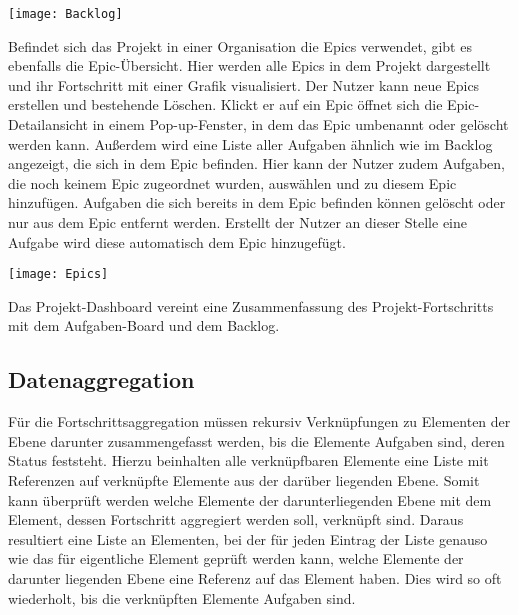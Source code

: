 \vspace{20pt}
\begin{center}
    \begin{minipage}{\linewidth}
        \texttt{[image: Backlog]}
    \end{minipage}
\end{center}
\vspace{20pt}

Befindet sich das Projekt in einer Organisation die Epics verwendet, gibt es ebenfalls die Epic-Übersicht. Hier werden alle Epics in dem Projekt dargestellt und ihr Fortschritt mit einer Grafik visualisiert. Der Nutzer kann neue Epics erstellen und bestehende Löschen. Klickt er auf ein Epic öffnet sich die Epic-Detailansicht in einem Pop-up-Fenster, in dem das Epic umbenannt oder gelöscht werden kann. Außerdem wird eine Liste aller Aufgaben ähnlich wie im Backlog angezeigt, die sich in dem Epic befinden. Hier kann der Nutzer zudem Aufgaben, die noch keinem Epic zugeordnet wurden, auswählen und zu diesem Epic hinzufügen. Aufgaben die sich bereits in dem Epic befinden können gelöscht oder nur aus dem Epic entfernt werden. Erstellt der Nutzer an dieser Stelle eine Aufgabe wird diese automatisch dem Epic hinzugefügt.

\vspace{20pt}
\begin{center}
    \begin{minipage}{\linewidth}
        \texttt{[image: Epics]}
    \end{minipage}
\end{center}
\vspace{20pt}

Das Projekt-Dashboard vereint eine Zusammenfassung des Projekt-Fortschritts mit dem Aufgaben-Board und dem Backlog.

\subsection{Datenaggregation}
Für die Fortschrittsaggregation müssen rekursiv Verknüpfungen zu Elementen der Ebene darunter zusammengefasst werden, bis die Elemente Aufgaben sind, deren Status feststeht. Hierzu beinhalten alle verknüpfbaren Elemente eine Liste mit Referenzen auf verknüpfte Elemente aus der darüber liegenden Ebene. Somit kann überprüft werden welche Elemente der darunterliegenden Ebene mit dem Element, dessen Fortschritt aggregiert werden soll, verknüpft sind. Daraus resultiert eine Liste an Elementen, bei der für jeden Eintrag der Liste genauso wie das für eigentliche Element geprüft werden kann, welche Elemente der darunter liegenden Ebene eine Referenz auf das Element haben. Dies wird so oft wiederholt, bis die verknüpften Elemente Aufgaben sind.

